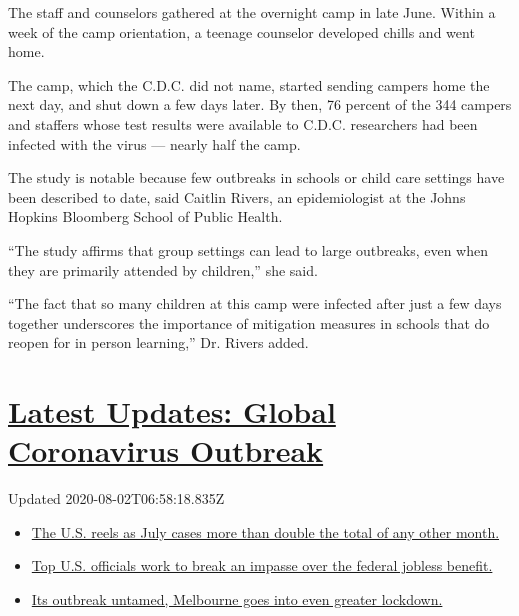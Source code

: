 The staff and counselors gathered at the overnight camp in late June.
Within a week of the camp orientation, a teenage counselor developed
chills and went home.

The camp, which the C.D.C. did not name, started sending campers home
the next day, and shut down a few days later. By then, 76 percent of the
344 campers and staffers whose test results were available to C.D.C.
researchers had been infected with the virus --- nearly half the camp.

The study is notable because few outbreaks in schools or child care
settings have been described to date, said Caitlin Rivers, an
epidemiologist at the Johns Hopkins Bloomberg School of Public Health.

``The study affirms that group settings can lead to large outbreaks,
even when they are primarily attended by children,'' she said.

``The fact that so many children at this camp were infected after just a
few days together underscores the importance of mitigation measures in
schools that do reopen for in person learning,'' Dr. Rivers added.

\hypertarget{latest-updates-global-coronavirus-outbreak}{%
\section{\texorpdfstring{\href{https://www.nytimes.com/2020/08/01/world/coronavirus-covid-19.html?action=click\&pgtype=Article\&state=default\&region=MAIN_CONTENT_1\&context=storylines_live_updates}{Latest
Updates: Global Coronavirus
Outbreak}}{Latest Updates: Global Coronavirus Outbreak}}\label{latest-updates-global-coronavirus-outbreak}}

Updated 2020-08-02T06:58:18.835Z

\begin{itemize}
\tightlist
\item
  \href{https://www.nytimes.com/2020/08/01/world/coronavirus-covid-19.html?action=click\&pgtype=Article\&state=default\&region=MAIN_CONTENT_1\&context=storylines_live_updates\#link-34047410}{The
  U.S. reels as July cases more than double the total of any other
  month.}
\item
  \href{https://www.nytimes.com/2020/08/01/world/coronavirus-covid-19.html?action=click\&pgtype=Article\&state=default\&region=MAIN_CONTENT_1\&context=storylines_live_updates\#link-780ec966}{Top
  U.S. officials work to break an impasse over the federal jobless
  benefit.}
\item
  \href{https://www.nytimes.com/2020/08/01/world/coronavirus-covid-19.html?action=click\&pgtype=Article\&state=default\&region=MAIN_CONTENT_1\&context=storylines_live_updates\#link-2bc8948}{Its
  outbreak untamed, Melbourne goes into even greater lockdown.}
\end{itemize}

